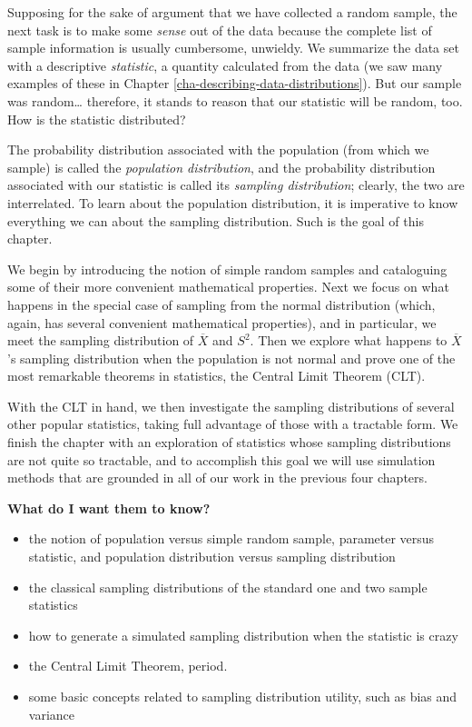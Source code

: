 \documentclass[]{book}
\providecommand{\tightlist}{%
  \setlength{\itemsep}{0pt}\setlength{\parskip}{0pt}}
\numberwithin{equation}{chapter}
\numberwithin{figure}{chapter}
\theoremstyle{plain}
\theoremstyle{definition}
\theoremstyle{remark}
\theoremstyle{definition}
\theoremstyle{definition}
\theoremstyle{remark}
\begin{document}
Supposing for the sake of argument that we have collected a random
sample, the next task is to make some \emph{sense} out of the data
because the complete list of sample information is usually cumbersome,
unwieldy. We summarize the data set with a descriptive \emph{statistic},
a quantity calculated from the data (we saw many examples of these in
Chapter \ref{cha-describing-data-distributions}). But our sample was
random\ldots{} therefore, it stands to reason that our statistic will be
random, too. How is the statistic distributed?

The probability distribution associated with the population (from which
we sample) is called the \emph{population distribution}, and the
probability distribution associated with our statistic is called its
\emph{sampling distribution}; clearly, the two are interrelated. To
learn about the population distribution, it is imperative to know
everything we can about the sampling distribution. Such is the goal of
this chapter.

We begin by introducing the notion of simple random samples and
cataloguing some of their more convenient mathematical properties. Next
we focus on what happens in the special case of sampling from the normal
distribution (which, again, has several convenient mathematical
properties), and in particular, we meet the sampling distribution of
\(\overline{X}\) and \(S^{2}\). Then we explore what happens to
\(\overline{X}\)'s sampling distribution when the population is not
normal and prove one of the most remarkable theorems in statistics, the
Central Limit Theorem (CLT).

With the CLT in hand, we then investigate the sampling distributions of
several other popular statistics, taking full advantage of those with a
tractable form. We finish the chapter with an exploration of statistics
whose sampling distributions are not quite so tractable, and to
accomplish this goal we will use simulation methods that are grounded in
all of our work in the previous four chapters.

\textbf{What do I want them to know?}

\begin{itemize}
\tightlist
\item
  the notion of population versus simple random sample, parameter versus
  statistic, and population distribution versus sampling distribution
\item
  the classical sampling distributions of the standard one and two
  sample statistics
\item
  how to generate a simulated sampling distribution when the statistic
  is crazy
\item
  the Central Limit Theorem, period.
\item
  some basic concepts related to sampling distribution utility, such as
  bias and variance
\end{itemize}
\end{document}
